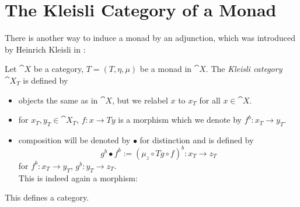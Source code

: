 \section{The Kleisli Category of a Monad}
There is another way to induce a monad by an adjunction, which was introduced by Heinrich Kleisli in \cite{kleisli}:
\begin{definition}
    Let $\cat{X}$ be a category, $T = (T,\eta, \mu)$ be a monad in $\cat{X}$.
    The \textit{Kleisli category $\cat{X}_T$} is defined by
    \begin{itemize}
        \item objects the same as in $\cat{X}$, but we relabel $x$ to $x_T$ for all $x \in \cat{X}$.
        \item for $x_T, y_T \in \cat{X}_T$, $f\colon x \to Ty$ is a morphism which we
        denote by $f^b \colon x_T \to y_T$.
        \item composition will be denoted by $\bullet$ for distinction and is defined by
        \[
            g^b \bullet f^b := (\mu_z \circ Tg \circ f)^b \colon x_T \to z_T
        \]
        for $f^b \colon x_T \to y_T$, $g^b \colon y_T \to z_T$. \\
        This is indeed again a morphism:
    \end{itemize}
\end{definition}
\begin{claim*}
    This defines a category.
\end{claim*}
